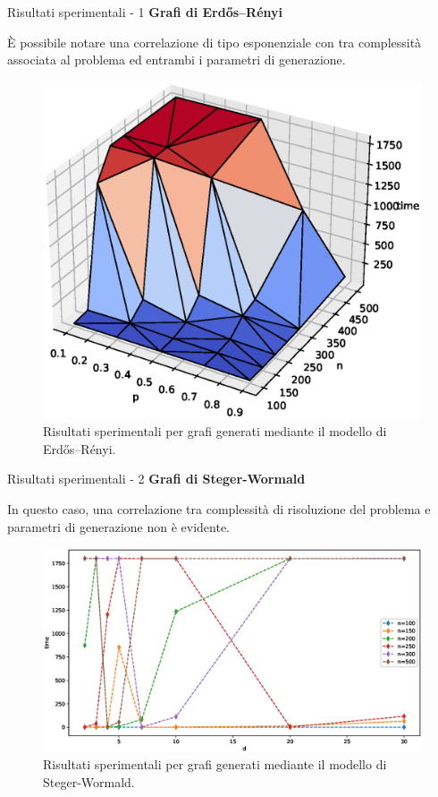 \documentclass[a4paper]{beamer}
\begin{document}
\begin{frame}{Risultati sperimentali - 1}
\textbf{Grafi di Erdős–Rényi}\\
\parbox{\linewidth}{È possibile notare una correlazione di tipo esponenziale con tra complessità associata al problema ed entrambi i parametri di generazione.}
\vspace{-1cm}
\begin{figure}[h!]
     \centering
\includegraphics[scale=0.35]{images/gnp-3d.eps}
\vspace{-0.5cm}
\caption{Risultati sperimentali per grafi generati mediante il modello di Erdős–Rényi.}
\end{figure}
\end{frame}

\begin{frame}{Risultati sperimentali - 2}
\textbf{Grafi di Steger-Wormald}\\
\parbox{\linewidth}{In questo caso, una correlazione tra complessità di risoluzione del problema e parametri di generazione non è evidente.}
\begin{figure}[h!]
     \centering
\includegraphics[scale=0.32]{images/rrg-d.eps}
\vspace{-0.1cm}
\caption{Risultati sperimentali per grafi generati mediante il modello di Steger-Wormald.}
\end{figure}
\end{frame}
\end{document}
